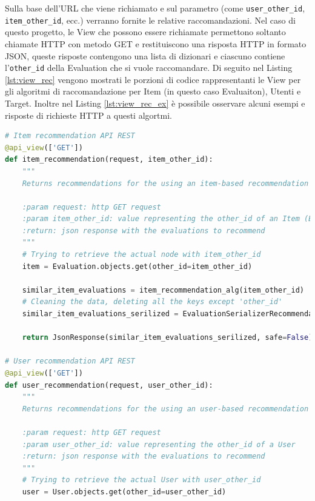 Sulla base dell'URL che viene richiamato e sul parametro (come \texttt{user\_other\_id}, \texttt{item\_other\_id}, ecc.) verranno fornite le 
relative raccomandazioni. Nel caso di questo progetto, le View che possono essere richiamate permettono soltanto chiamate HTTP con metodo GET 
e restituiscono una risposta HTTP in formato JSON, queste risposte contengono una lista di dizionari e ciascuno contiene l'\texttt{other\_id} della Evaluation 
che si vuole raccomandare. Di seguito nel Listing \ref{lst:view_rec} vengono mostrati le porzioni di codice rappresentanti 
le View per gli algoritmi di raccomandazione per Item (in questo caso Evaluaiton), Utenti e Target. Inoltre nel Listing \ref{lst:view_rec_ex} è 
possibile osservare alcuni esempi e risposte di richieste HTTP a questi algortmi.\hfill\break
\lstset{style=python_code_style}
\begin{lstlisting}[language=Python, label=lst:view_rec, caption={Porzione parziale del codice contenuto nelle View per implementare
    i sistemi di raccomandazione.}]
# Item recommendation API REST
@api_view(['GET'])
def item_recommendation(request, item_other_id):
    """
    Returns recommendations for the using an item-based recommendation algorithm for the Evaluation `item_other_id`
 
    :param request: http GET request
    :param item_other_id: value representing the other_id of an Item (Evaluation)
    :return: json response with the evaluations to recommend
    """
    # Trying to retrieve the actual node with item_other_id
    item = Evaluation.objects.get(other_id=item_other_id)
 
    similar_item_evaluations = item_recommendation_alg(item_other_id)
    # Cleaning the data, deleting all the keys except 'other_id'
    similar_item_evaluations_serilized = EvaluationSerializerRecommendation(similar_item_evaluations, many=True).data
 
    return JsonResponse(similar_item_evaluations_serilized, safe=False)
 
# User recommendation API REST
@api_view(['GET'])
def user_recommendation(request, user_other_id):
    """
    Returns recommendations for the using an user-based recommendation algorithm for the user `user_other_id`
 
    :param request: http GET request
    :param user_other_id: value representing the other_id of a User
    :return: json response with the evaluations to recommend
    """
    # Trying to retrieve the actual User with user_other_id
    user = User.objects.get(other_id=user_other_id)
 

\end{lstlisting}
